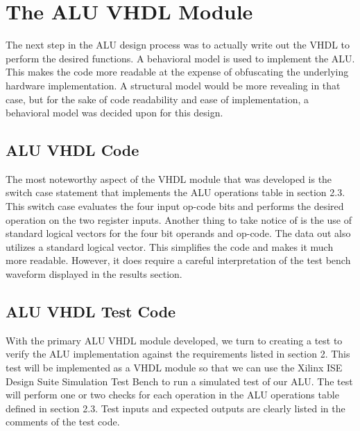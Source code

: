 \documentclass{article}
\begin{document}
\section{The ALU VHDL Module}

The next step in the ALU design process was to actually write out the
VHDL to perform the desired functions. A behavioral model is used to implement
the ALU. This makes the code more readable at the expense of obfuscating the underlying
hardware implementation. A structural model would be more revealing in that case, but for
the sake of code readability and ease of implementation, a behavioral model was decided upon
for this design.

\subsection{ALU VHDL Code}
The most noteworthy aspect of the VHDL module that was developed is the switch case 
statement that implements the ALU operations table in section 2.3. This switch case evaluates
the four input op-code bits and performs the desired operation on the two register inputs. 
Another thing to take notice of is the use of standard logical vectors for the four bit
operands and op-code. The data out also utilizes a standard logical vector. This simplifies the
code and makes it much more readable. However, it does require a careful interpretation of the
test bench waveform displayed in the results section.



\subsection{ALU VHDL Test Code}
With the primary ALU VHDL module developed, we turn to creating a test to verify the ALU 
implementation against the requirements listed in section 2. This test will be implemented
as a VHDL module so that we can use the Xilinx ISE Design Suite Simulation Test Bench to
run a simulated test of our ALU. The test will perform one or two checks for each operation
in the ALU operations table defined in section 2.3. Test inputs and expected outputs are 
clearly listed in the comments of the test code.


\newpage
\end{document}
